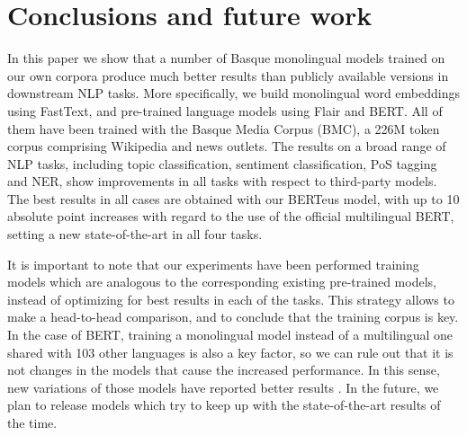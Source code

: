 \documentclass[10pt, a4paper]{article}
\begin{document}
\begin{table*}[!t]
\centering
{}
\caption{An example from the EIEC corpus where the mBERT model misses to disambiguate the cases of metonymy. English translation of the sentence: \textit{``On that issue about Chechenya the support given by the United States and Western Europe has been visible.''}}
\label{tab:ner-examples}
\end{table*}

\section{Conclusions and future work}\label{sec:concl-future-work}

In this paper we show that a number of Basque monolingual models trained on our own corpora produce much better results than publicly available versions in downstream NLP tasks. More specifically, we build monolingual word embeddings using FastText, and pre-trained language models using Flair and BERT. All of them have been trained with the Basque Media Corpus (BMC), a 226M token corpus comprising Wikipedia and news outlets. The results on a broad range of NLP tasks, including topic classification, sentiment classification, PoS tagging and NER, show improvements in all tasks with respect to third-party models. The best results in all cases are obtained with our BERTeus model, with up to 10 absolute point increases with regard to the use of the official multilingual BERT, setting a new state-of-the-art in all four tasks.

It is important to note that our experiments have been performed training models which are analogous to the corresponding existing pre-trained models, instead of optimizing for best results in each of the tasks. This strategy allows to make a head-to-head comparison, and to conclude that the training corpus is key. In the case of BERT, training a monolingual model instead of a multilingual one shared with 103 other languages is also a key factor, so we can rule out that it is not changes in the models that cause the increased performance. In this sense, new variations of those models have reported better results \cite{liu2019roberta}. In the future, we plan to release models which try to keep up with the state-of-the-art results of the time.
\end{document}
